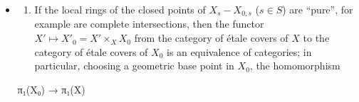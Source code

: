 \documentclass[
]{article}
\newenvironment{Shaded}{}{}
\newcommand{\NormalTok}[1]{#1}
\providecommand{\tightlist}{%
  \setlength{\itemsep}{0pt}\setlength{\parskip}{0pt}}
\begin{document}
\begin{itemize}
\item
  \begin{enumerate}
  \def\labelenumi{\alph{enumi})}
  \tightlist
  \item
    If the local rings of the closed points of \(X_{s} - X_{0,s}\)
    (\(s \in S\)) are ``pure'', for example are complete intersections,
    then the functor \(X' \mapsto X'_{0} = X' \times_{X} X_{0}\) from
    the category of étale covers of \(X\) to the category of étale
    covers of \(X_{0}\) is an equivalence of categories; in particular,
    choosing a geometric base point in \(X_{0}\), the homomorphism
  \end{enumerate}

\begin{Shaded}
\begin{Highlighting}[]
\NormalTok{π₁(X₀) → π₁(X)}
\end{Highlighting}
\end{Shaded}


\end{itemize}
\end{document}
